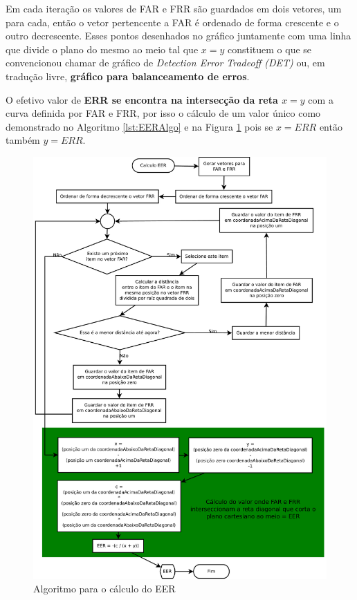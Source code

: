 		\par Em cada iteração os valores de FAR e FRR são guardados em dois vetores, um para cada, então o vetor pertencente a FAR é ordenado de forma crescente e o outro decrescente. Esses pontos desenhados no gráfico juntamente com uma linha que divide o plano do mesmo ao meio tal que $x=y$ constituem o que se convencionou chamar de gráfico de \textit{Detection Error Tradeoff (DET)} ou, em tradução livre, \textbf{gráfico para balanceamento de erros}.
		
		\par O efetivo valor de \textbf{ERR se encontra na intersecção da reta $x=y$} com a curva definida por FAR e FRR, por isso o cálculo de um valor único como demonstrado no Algoritmo \ref{lst:EERAlgo} e na Figura \ref{fig:eeralgo} pois se $x=ERR$ então também $y=ERR$.\\
	
		

		\begin{figure}[H]
			\centering
			\includegraphics[width=1\linewidth]{images/EERAlgo.pdf}
			\caption{Algoritmo para o cálculo do EER}
			\label{fig:eeralgo}
		\end{figure}
	
